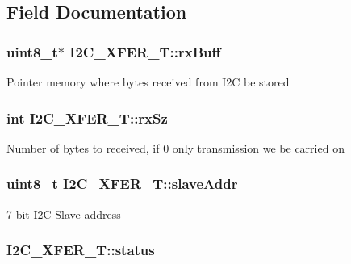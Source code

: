 \subsection{Field Documentation}
\hypertarget{structI2C__XFER__T_a905dce25e8fc1dc85c4b76e789f62623}{
\subsubsection[{rx\-Buff}]{\setlength{\rightskip}{0pt plus 5cm}uint8\-\_\-t$\ast$ I2\-C\-\_\-\-X\-F\-E\-R\-\_\-\-T\-::rx\-Buff}}\label{structI2C__XFER__T_a905dce25e8fc1dc85c4b76e789f62623}
Pointer memory where bytes received from I2\-C be stored \hypertarget{structI2C__XFER__T_a8c5b062847cfd0fe9b27058743de8aa5}{
\subsubsection[{rx\-Sz}]{\setlength{\rightskip}{0pt plus 5cm}int I2\-C\-\_\-\-X\-F\-E\-R\-\_\-\-T\-::rx\-Sz}}\label{structI2C__XFER__T_a8c5b062847cfd0fe9b27058743de8aa5}
Number of bytes to received, if 0 only transmission we be carried on \hypertarget{structI2C__XFER__T_a39393422071ba7bca5d22e15b110e723}{
\subsubsection[{slave\-Addr}]{\setlength{\rightskip}{0pt plus 5cm}uint8\-\_\-t I2\-C\-\_\-\-X\-F\-E\-R\-\_\-\-T\-::slave\-Addr}}\label{structI2C__XFER__T_a39393422071ba7bca5d22e15b110e723}
7-\/bit I2\-C Slave address \hypertarget{structI2C__XFER__T_aefc3cfe9bf7cdaeb2a632c42250602ad}{
\subsubsection[{status}]{ I2\-C\-\_\-\-X\-F\-E\-R\-\_\-\-T\-::status}}\label{structI2C__XFER__T_aefc3cfe9bf7cdaeb2a632c42250602ad}

